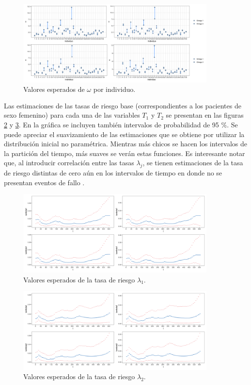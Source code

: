 \documentclass[11pt,a4paper]{article}
\begin{document}
\begin{figure}[!p]
\centering\includegraphics[width=10cm]{frailties.png}
\caption{Valores esperados de $\omega$ por individuo.}
\label{fig:frailties}
\end{figure}

Las estimaciones de las tasas de riesgo base (correspondientes a los pacientes de sexo femenino) para cada una de las variables $T_1$ y $T_2$ se presentan en las figuras \ref{fig:haz_lambda1} y \ref{fig:haz_lambda2}. En la gráfica se incluyen también intervalos de probabilidad de 95 \%. Se puede apreciar el suavizamiento de las estimaciones que se obtiene por utilizar la distribución inicial no paramétrica. Mientras más chicos se hacen los intervalos de la partición del tiempo, más suaves se verán estas funciones. Es interesante notar que, al introducir correlación entre las tasas $\lambda_j$, se tienen estimaciones de la tasa de riesgo distintas de cero aún en los intervalos de tiempo en donde no se presentan eventos de fallo \citep{nieto}.\\

\begin{figure}[!p]
\centering\includegraphics[width=10cm]{hazard1.png}
\caption{Valores esperados de la tasa de riesgo $\lambda_1$.}
\label{fig:haz_lambda1}
\end{figure}

\begin{figure}[!p]
\centering\includegraphics[width=10cm]{hazard2.png}
\caption{Valores esperados de la tasa de riesgo $\lambda_2$.}
\label{fig:haz_lambda2}
\end{figure}
\end{document}
